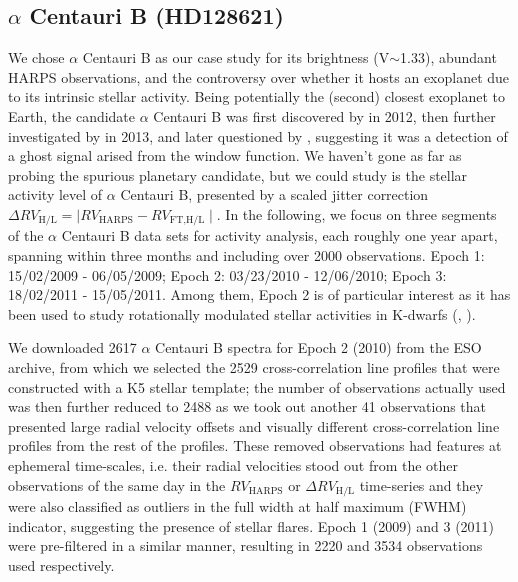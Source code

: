 \subsection{$\alpha$ Centauri B (HD128621)}

We chose $\alpha$ Centauri B as our case study for its brightness (V$\sim$1.33), abundant HARPS observations, and the controversy over whether it hosts an exoplanet due to its intrinsic stellar activity. Being potentially the (second) closest exoplanet to Earth, the candidate $\alpha$ Centauri B was first discovered by \cite{Dumusque_Centauri_B} in 2012, then further investigated by \cite{Hatzes2013} in 2013, and later questioned by \cite{Rajpaul_Alpha_Cen_B}, suggesting it was a detection of a ghost signal arised from the window function. We haven't gone as far as probing the spurious planetary candidate, but we could study is the stellar activity level of $\alpha$ Centauri B, presented by a scaled jitter correction $\Delta RV_\text{H/L} = \mid RV_\text{HARPS} - RV_\text{FT,H/L}\mid$. In the following, we focus on three segments of the $\alpha$ Centauri B data sets for activity analysis, each roughly one year apart, spanning within three months and including over 2000 observations. Epoch 1: 15/02/2009 - 06/05/2009; Epoch 2: 03/23/2010 - 12/06/2010; Epoch 3: 18/02/2011 - 15/05/2011. Among them, Epoch 2 is of particular interest as it has been used to study rotationally modulated stellar activities in K-dwarfs (\cite{Thompson2017MNRAS}, \cite{Wise2018}). 

We downloaded 2617 $\alpha$ Centauri B spectra for Epoch 2 (2010) from the ESO archive, from which we selected the 2529 cross-correlation line profiles that were constructed with a K5 stellar template; the number of observations actually used was then further reduced to 2488 as we took out another 41 observations that presented large radial velocity offsets and visually different cross-correlation line profiles from the rest of the profiles. These removed observations had features at ephemeral time-scales, i.e. their radial velocities stood out from the other observations of the same day in the $RV_\text{HARPS}$ or $\Delta RV_\text{H/L}$ time-series and they were also classified as outliers in the full width at half maximum (FWHM) indicator, suggesting the presence of stellar flares. Epoch 1 (2009) and 3 (2011) were pre-filtered in a similar manner, resulting in 2220 and 3534 observations used respectively.

